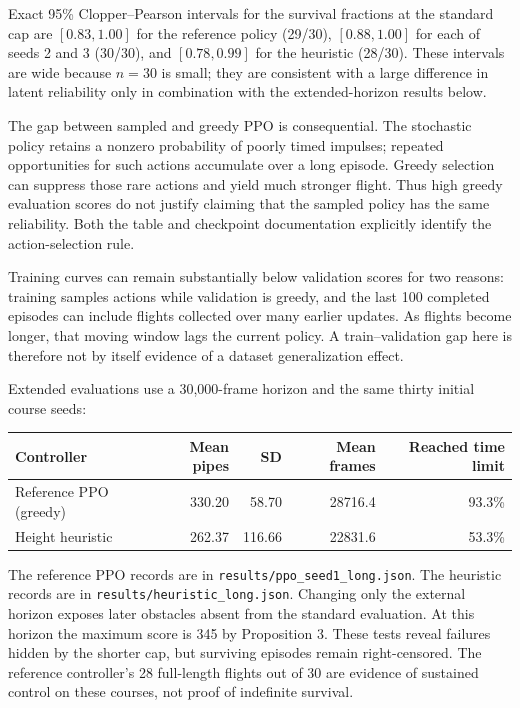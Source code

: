 \documentclass[
  11pt,
]{article}
\newcounter{none} %
\begin{document}
Exact 95\% Clopper--Pearson intervals for the survival fractions at the
standard cap are \([0.83,1.00]\) for the reference policy (29/30),
\([0.88,1.00]\) for each of seeds 2 and 3 (30/30), and \([0.78,0.99]\)
for the heuristic (28/30). These intervals are wide because \(n=30\) is
small; they are consistent with a large difference in latent reliability
only in combination with the extended-horizon results below.

The gap between sampled and greedy PPO is consequential. The stochastic
policy retains a nonzero probability of poorly timed impulses; repeated
opportunities for such actions accumulate over a long episode. Greedy
selection can suppress those rare actions and yield much stronger
flight. Thus high greedy evaluation scores do not justify claiming that
the sampled policy has the same reliability. Both the table and
checkpoint documentation explicitly identify the action-selection rule.

Training curves can remain substantially below validation scores for two
reasons: training samples actions while validation is greedy, and the
last 100 completed episodes can include flights collected over many
earlier updates. As flights become longer, that moving window lags the
current policy. A train--validation gap here is therefore not by itself
evidence of a dataset generalization effect.

Extended evaluations use a 30,000-frame horizon and the same thirty
initial course seeds:

{\def\LTcaptype{none} %
\begin{longtable}[]{@{}lrrrr@{}}
\toprule\noalign{}
Controller & Mean pipes & SD & Mean frames & Reached time limit \\
\midrule\noalign{}
\endhead
\bottomrule\noalign{}
\endlastfoot
Reference PPO (greedy) & 330.20 & 58.70 & 28716.4 & 93.3\% \\
Height heuristic & 262.37 & 116.66 & 22831.6 & 53.3\% \\
\end{longtable}
}

The reference PPO records are in \texttt{results/ppo\_seed1\_long.json}.
The heuristic records are in \texttt{results/heuristic\_long.json}.
Changing only the external horizon exposes later obstacles absent from
the standard evaluation. At this horizon the maximum score is 345 by
Proposition 3. These tests reveal failures hidden by the shorter cap,
but surviving episodes remain right-censored. The reference controller's
28 full-length flights out of 30 are evidence of sustained control on
these courses, not proof of indefinite survival.
\end{document}
